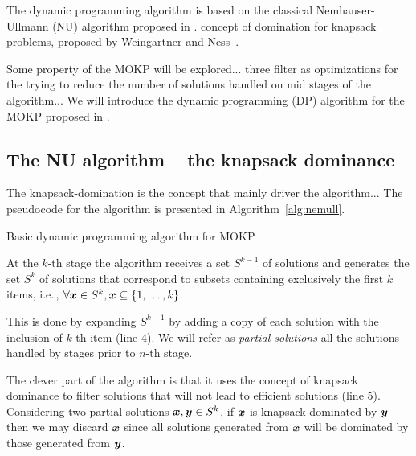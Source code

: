 

The dynamic programming algorithm is based on the classical Nemhauser-Ullmann (NU) algorithm proposed
in \cite{nemhauser1969discrete}.
concept of domination for knapsack problems,
proposed by Weingartner and Ness~\cite{weingartner1967methods}.

Some property of the MOKP will be explored...
three filter as optimizations for the trying
to reduce the number of solutions
handled on mid stages of the algorithm...
We will introduce the dynamic programming (DP) algorithm for the MOKP proposed in \cite{bazgan2009}.


\subsection{The NU algorithm -- the knapsack dominance}
The knapsack-domination is the concept that mainly driver the algorithm...
The pseudocode for the algorithm is presented in Algorithm~\ref{alg:nemull}.
\begin{algorithm}
  \caption{Basic dynamic programming algorithm for MOKP}
  \label{alg:nemull}
  
\end{algorithm}
At the $k$-th stage the algorithm receives a set $S^{k-1}$ of solutions and
generates the set $S^k$ of solutions that correspond
to subsets containing exclusively the first $k$ items, i.e.\,,
$\forall\boldsymbol{x} \in S^k, \boldsymbol{x} \subseteq \{1, \ldots, k\}$.

This is done by expanding $S^{k-1}$ by adding a copy of each solution with the
inclusion of $k$-th item (line 4).
We will refer as \emph{partial solutions} all the solutions handled by
stages prior to $n$-th stage.

The clever part of the algorithm is that it uses the concept of knapsack dominance
to filter solutions that will not lead to efficient solutions (line 5).
Considering two partial solutions $\boldsymbol{x}, \boldsymbol{y} \in S^k$, if
$\boldsymbol{x}$ is knapsack-dominated by $\boldsymbol{y}$ then we may discard $\boldsymbol{x}$ since all
solutions generated from $\boldsymbol{x}$ will be dominated by those generated from $\boldsymbol{y}$.

